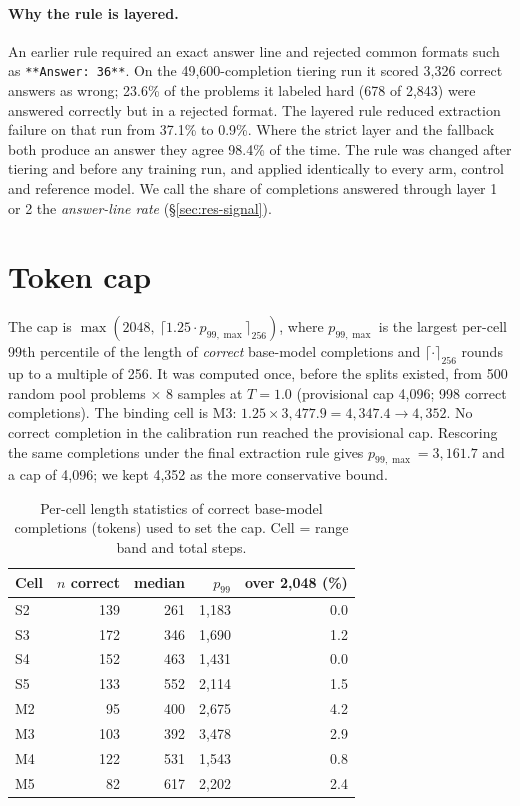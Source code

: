 \documentclass{article}
\begin{document}
\paragraph{Why the rule is layered.} An earlier rule required an exact answer line and rejected common formats such as \texttt{**Answer: 36**}. On the 49{,}600-completion tiering run it scored 3{,}326 correct answers as wrong; 23.6\% of the problems it labeled hard (678 of 2{,}843) were answered correctly but in a rejected format. The layered rule reduced extraction failure on that run from 37.1\% to 0.9\%. Where the strict layer and the fallback both produce an answer they agree 98.4\% of the time. The rule was changed after tiering and before any training run, and applied identically to every arm, control and reference model. We call the share of completions answered through layer 1 or 2 the \emph{answer-line rate} (\S\ref{sec:res-signal}).

\section{Token cap}
\label{app:cap}

The cap is $\max\!\left(2048,\ \lceil 1.25 \cdot p_{99,\max} \rceil_{256}\right)$, where $p_{99,\max}$ is the largest per-cell 99th percentile of the length of \emph{correct} base-model completions and $\lceil\cdot\rceil_{256}$ rounds up to a multiple of 256. It was computed once, before the splits existed, from 500 random pool problems $\times$ 8 samples at $T{=}1.0$ (provisional cap 4{,}096; 998 correct completions). The binding cell is M3: $1.25 \times 3{,}477.9 = 4{,}347.4 \rightarrow 4{,}352$. No correct completion in the calibration run reached the provisional cap. Rescoring the same completions under the final extraction rule gives $p_{99,\max} = 3{,}161.7$ and a cap of 4{,}096; we kept 4{,}352 as the more conservative bound.

\begin{table}[!ht]
\centering\small
\caption{Per-cell length statistics of correct base-model completions (tokens) used to set the cap. Cell = range band and total steps.}
\label{tab:cap}
\begin{tabular}{lrrrr}
\toprule
Cell & $n$ correct & median & $p_{99}$ & over 2{,}048 (\%) \\
\midrule
S2 & 139 & 261 & 1{,}183 & 0.0 \\
S3 & 172 & 346 & 1{,}690 & 1.2 \\
S4 & 152 & 463 & 1{,}431 & 0.0 \\
S5 & 133 & 552 & 2{,}114 & 1.5 \\
M2 & 95  & 400 & 2{,}675 & 4.2 \\
M3 & 103 & 392 & 3{,}478 & 2.9 \\
M4 & 122 & 531 & 1{,}543 & 0.8 \\
M5 & 82  & 617 & 2{,}202 & 2.4 \\
\bottomrule
\end{tabular}
\end{table}
\end{document}

